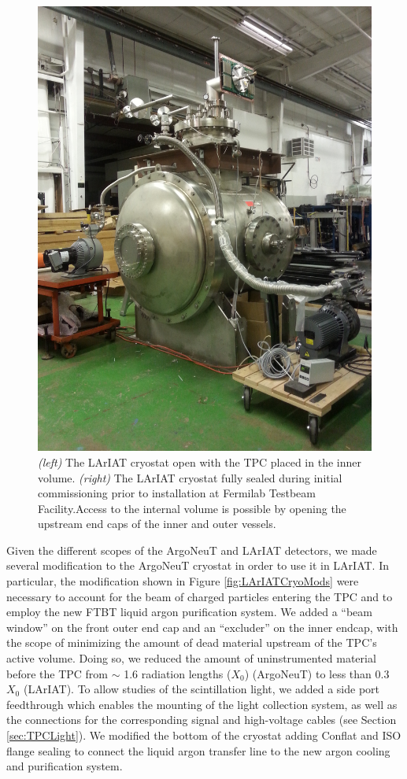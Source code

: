 \begin{figure}[htb]
\includegraphics[scale=0.07]{Chapter-3/Images/Cryostat2.jpg}
\caption{\emph{(left)} The LArIAT cryostat open with the TPC placed in the inner volume. \emph{(right)} The LArIAT cryostat fully sealed during initial commissioning prior to installation at Fermilab Testbeam Facility.Access to the internal volume is possible by opening the upstream end caps of the inner and outer vessels. }
\label{fig:LArIATCryoStat}
\end{figure}

Given the different scopes of the ArgoNeuT and LArIAT detectors, we made several modification to the ArgoNeuT cryostat in order to use it in LArIAT. In particular, the modification  shown in Figure \ref{fig:LArIATCryoMods} were necessary to account for the beam of charged particles entering the TPC and to employ the new FTBT liquid argon purification system. 
We added a ``beam window'' on the front outer end cap and an ``excluder'' on the inner endcap, with the scope of minimizing the amount of dead material upstream of the TPC's active volume.  Doing so, we reduced the amount of uninstrumented material before the TPC from $\sim$ 1.6 radiation lengths ($X_{0}$) (ArgoNeuT) to less than 0.3 $X_{0}$ (LArIAT). To allow studies of the scintillation light, we added a side port feedthrough which enables the mounting of the light collection system, as well as the connections for the corresponding signal and high-voltage cables (see Section \ref{sec:TPCLight}).  We modified the bottom of the cryostat adding Conflat and ISO flange sealing to connect the liquid argon transfer line to the new argon cooling and purification system.


